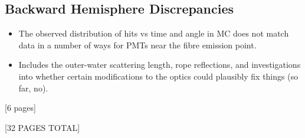 {    \subsection{Backward Hemisphere Discrepancies}
    \begin{itemize}
        \item The observed distribution of hits vs time and angle in MC does not match data in a number of ways for PMTs near the fibre emission point.
        \item Includes the outer-water scattering length, rope reflections, and investigations into whether certain modifications to the optics could plausibly fix things (so far, no).
    \end{itemize}
   [6 pages]
   
   [32 PAGES TOTAL]
}